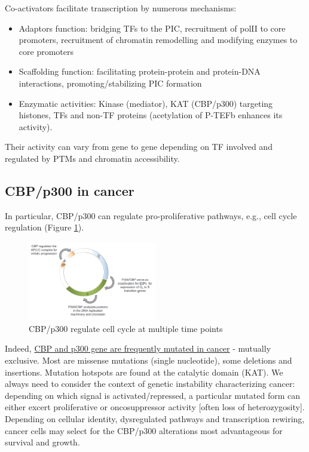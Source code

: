 Co-activators facilitate transcription by numerous mechanisms:

\begin{itemize}
\tightlist
\item
  Adaptors function: bridging TFs to the PIC, recruitment of polII to core promoters, recruitment of chromatin remodelling and modifying enzymes to core promoters
\item
  Scaffolding function: facilitating protein-protein and protein-DNA interactions, promoting/stabilizing PIC formation
\item
  Enzymatic activities: Kinase (mediator), KAT (CBP/p300) targeting histones, TFs and non-TF proteins (acetylation of P-TEFb enhances its activity).
\end{itemize}

Their activity can vary from gene to gene depending on TF involved and regulated by PTMs and chromatin accessibility.

\hypertarget{crepp300-in-cancer}{%
\subsection{CBP/p300 in cancer}\label{crepp300-in-cancer}}

In particular, CBP/p300 can regulate pro-proliferative pathways, e.g., cell cycle regulation (Figure \ref{fig:cycle}).

\begin{figure}
\centering
\includegraphics[width=0.5\textwidth]{../_resources/Screenshot_2022-10-12_at_09-01-27.png}
\caption{CBP/p300 regulate cell cycle at multiple time points}
\label{fig:cycle}
\end{figure}

Indeed, \underline{CBP and p300 gene are frequently mutated in cancer} - mutually exclusive. Most are missense mutations (single nucleotide), some deletions and insertions. Mutation hotspots are found at the catalytic domain (KAT). We always need to consider the context of genetic instability characterizing cancer: depending on which signal is activated/repressed, a particular mutated form can either excert proliferative or oncosuppressor activity {[}often loss of heterozygosity{]}. Depending on cellular identity, dysregulated pathways and transcription rewiring, cancer cells may select for the CBP/p300 alterations most advantageous for survival and growth.

